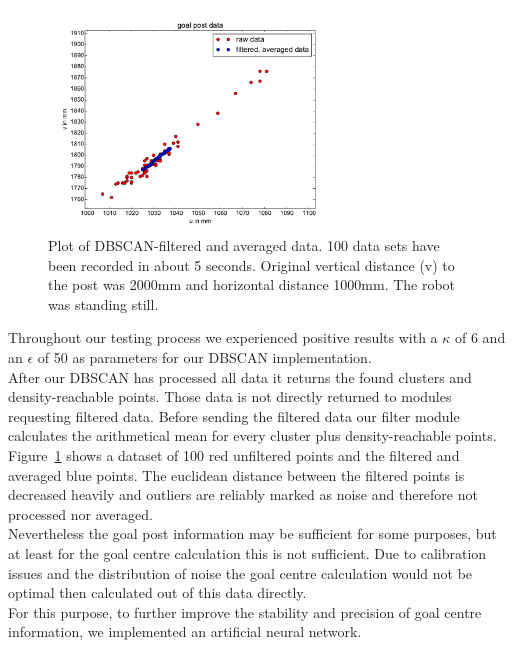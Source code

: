 \documentclass[lnicst,a4paper]{svmultln}
\begin{document}
\begin{figure}
 	\centerline{\includegraphics[width=0.7\textwidth]{dbscan_data_plot1.pdf}}
	{\caption{Plot of DBSCAN-filtered and averaged data. 100 data sets have been recorded in about 5 seconds. Original vertical distance (v) to the post was 2000mm and horizontal distance 1000mm. The robot was standing still.}\label{fig:dbscan_plot1}}
\end{figure}

Throughout our testing process we experienced positive results with a $\kappa$ of 6 and an $\epsilon$ of 50 as parameters for our DBSCAN implementation.
\\
After our DBSCAN has processed all data it returns the found clusters and density-reachable points. Those data is not directly returned to modules requesting filtered data.
Before sending the filtered data our filter module calculates the arithmetical mean for every cluster plus density-reachable points.
\\
Figure~\ref{fig:dbscan_plot1} shows a dataset of 100 red unfiltered points and the filtered and averaged blue points. The euclidean distance between the filtered points is decreased heavily and outliers are reliably marked as noise and therefore not processed nor averaged.
\\
Nevertheless the goal post information may be sufficient for some purposes, but at least for the goal centre calculation this is not sufficient. Due to calibration issues and the distribution of noise the goal centre calculation would not be optimal then calculated out of this data directly.
\\
For this purpose, to further improve the stability and precision of goal centre information, we implemented an artificial neural network.
\end{document}
